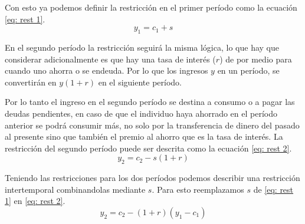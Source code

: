 Con esto ya podemos definir la restricción en el primer período como la ecuación \ref{eq: rest 1}.
\begin{equation}
    y_1 = c_1+s \label{eq: rest 1}
\end{equation}

En el segundo período la restricción seguirá la misma lógica, lo que hay que considerar adicionalmente es que hay una tasa de interés ($r$) de por medio para cuando uno ahorra o se endeuda. Por lo que los ingresos $y$ en un período, se convertirán en $y(1+r)$ en el siguiente período.

Por lo tanto el ingreso en el segundo período se destina a consumo o a pagar las deudas pendientes, en caso de que el individuo haya ahorrado en el período anterior se podrá consumir más, no solo por la transferencia de dinero del pasado al presente sino que también el premio al ahorro que es la tasa de interés. La restricción del segundo período puede ser descrita como la ecuación \ref{eq: rest 2}.
\begin{equation}
    y_2 = c_2 - s(1+r) \label{eq: rest 2}
\end{equation}

Teniendo las restricciones para los dos períodos podemos describir una restricción intertemporal combinandolas mediante $s$. Para esto reemplazamos $s$ de \ref{eq: rest 1} en \ref{eq: rest 2}.
\begin{equation*}
    y_2 = c_2 - (1+r)(y_1-c_1) 
\end{equation*}

